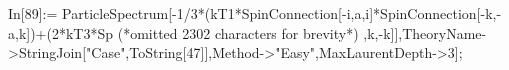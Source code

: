 In[89]:= ParticleSpectrum[-1/3*(kT1*SpinConnection[-i,a,i]*SpinConnection[-k,-a,k])+(2*kT3*Sp (*omitted 2302 characters for brevity*) ,k,-k]],TheoryName->StringJoin["Case",ToString[47]],Method->"Easy",MaxLaurentDepth->3];